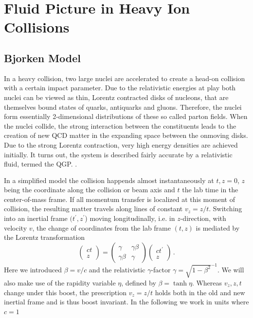 \chapter{Fluid Picture in Heavy Ion Collisions}

\section{Bjorken Model}

In a heavy collision, two large nuclei are accelerated to create a head-on collision with a certain impact parameter. Due to the relativistic energies at play both nuclei can be viewed as thin, Lorentz contracted disks of nucleons, that are themselves bound states of quarks, antiquarks and gluons. Therefore, the nuclei form essentially 2-dimensional distributions of these so called parton fields. When the nuclei collide, the strong interaction between the constituents leads to the creation of new QCD matter in the expanding space between the onmoving disks. Due to the strong Lorentz contraction, very high energy densities are achieved initially. It turns out, the system is described fairly accurate by a relativistic fluid, termed the QGP. .

In a simplified model \cite{Ollitrault_2008} the collision happends almost instantaneously at ${t,z=0}$, $z$ being the coordinate along the collision or beam axis and $t$ the lab time in the center-of-mass frame. If all momentum transfer is localized at this moment of collision, the resulting matter travels along lines of constant ${v_z=z/t}$. Switching into an inertial frame $(t^\prime,z^\prime$) moving longitudinally, i.e. in $z$-direction, with velocity $v$, the change of coordinates from the lab frame $(t,z)$ is mediated by the Lorentz transformation
\begin{equation}
    \begin{pmatrix}
        ct\\z
    \end{pmatrix}
    =
    \begin{pmatrix}
        \gamma&\gamma\beta\\
        \gamma\beta &\gamma
    \end{pmatrix}
    \begin{pmatrix}
        ct^\prime\\
        z
    \end{pmatrix}\,.
\end{equation}
Here we introduced ${\beta=v/c}$ and the relativistic $\gamma$-factor ${\gamma=\sqrt{1-\beta^2}^{-1}}$. We will also make use of the rapidity variable $\eta$, defined by ${\beta=\tanh\eta}$. Whereas ${v_z,z,t}$ change under this boost, the prescription ${v_z=z/t}$ holds both in the old and new inertial frame and is thus boost invariant. In the following we work in units where ${c=1}$

